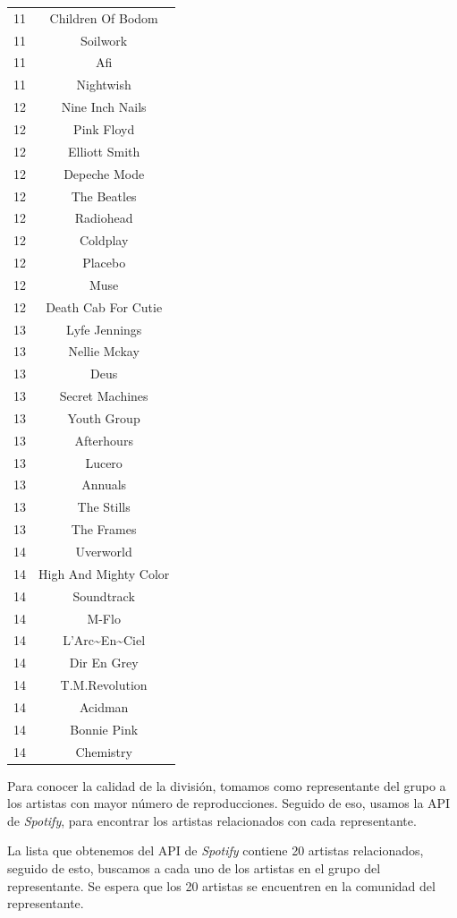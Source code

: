 \documentclass[conference]{IEEEtran}
\begin{document}
\begin{table}[]
\begin{tabular}{|c|c|}
11 & Children Of Bodom \\ 
11 & Soilwork \\ 
11 & Afi \\ 
11 & Nightwish \\  \hline
12 & Nine Inch Nails \\ 
12 & Pink Floyd \\ 
12 & Elliott Smith \\ 
12 & Depeche Mode \\ 
12 & The Beatles \\ 
12 & Radiohead \\ 
12 & Coldplay \\ 
12 & Placebo \\ 
12 & Muse \\ 
12 & Death Cab For Cutie \\  \hline
13 & Lyfe Jennings \\ 
13 & Nellie Mckay \\ 
13 & Deus \\ 
13 & Secret Machines \\ 
13 & Youth Group \\ 
13 & Afterhours \\ 
13 & Lucero \\ 
13 & Annuals \\ 
13 & The Stills \\ 
13 & The Frames \\  \hline
14 & Uverworld \\ 
14 & High And Mighty Color \\ 
14 & Soundtrack \\ 
14 & M-Flo \\ 
14 & L'Arc\~{}En\~{}Ciel \\ 
14 & Dir En Grey \\ 
14 & T.M.Revolution \\ 
14 & Acidman \\ 
14 & Bonnie Pink \\ 
14 & Chemistry \\ 

   \hline
\end{tabular}
\end{table}
\newpage
Para conocer la calidad de la división, tomamos como representante del grupo a los artistas con mayor número de reproducciones. Seguido de eso, usamos la API de \textit{Spotify}, para encontrar los artistas relacionados con cada representante.

La lista que obtenemos del API de \textit{Spotify} contiene 20 artistas relacionados, seguido de esto,  
buscamos a cada uno de los artistas en el grupo del representante. Se espera que los 20 artistas 
se encuentren en la comunidad del representante.
\end{document}
